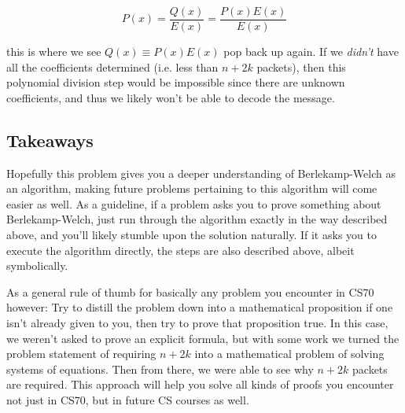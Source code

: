 \documentclass[10pt]{article}
\begin{document}
    \[ P(x) = \frac{Q(x)}{E(x)} = \frac{P(x) E(x)}{E(x)}\] 

    this is where we see $Q(x) \equiv P(x) E(x)$ pop back up again. If we \textit{didn't} have all the coefficients determined (i.e. less than $n+2k$ packets), then this polynomial division step would be impossible since there are unknown coefficients, and thus we likely won't be able to decode the message.

    \subsection*{Takeaways}

    Hopefully this problem gives you a deeper understanding of Berlekamp-Welch as an algorithm, making future problems pertaining to this algorithm will come easier as well. As a guideline, if a problem asks you to prove something about Berlekamp-Welch, just run through the algorithm exactly in the way described above, and you'll likely stumble upon the solution naturally. If it asks you to execute the algorithm directly, the steps are also described above, albeit symbolically.

    As a general rule of thumb for basically any problem you encounter in CS70 however: Try to distill the problem down into a mathematical proposition if one isn't already given to you, then try to prove that proposition true. In this case, we weren't asked to prove an explicit formula, but with some work we turned the problem statement of requiring $n+2k$ into a mathematical problem of solving systems of equations. Then from there, we were able to see why $n+2k$ packets are required. This approach will help you solve all kinds of proofs you encounter not just in CS70, but in future CS courses as well.
    
\end{document}
